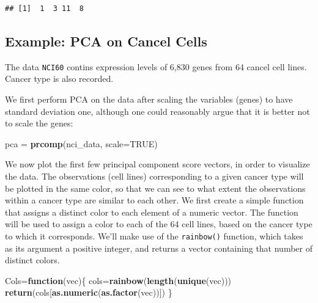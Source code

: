 \documentclass[openany]{book}
\newenvironment{Shaded}{\begin{snugshade}}{\end{snugshade}}
\newcommand{\ControlFlowTok}[1]{\textcolor[rgb]{0.13,0.29,0.53}{\textbf{#1}}}
\newcommand{\DataTypeTok}[1]{\textcolor[rgb]{0.13,0.29,0.53}{#1}}
\newcommand{\KeywordTok}[1]{\textcolor[rgb]{0.13,0.29,0.53}{\textbf{#1}}}
\newcommand{\NormalTok}[1]{#1}
\newcommand{\OperatorTok}[1]{\textcolor[rgb]{0.81,0.36,0.00}{\textbf{#1}}}
\newcommand{\OtherTok}[1]{\textcolor[rgb]{0.56,0.35,0.01}{#1}}
\newcommand{\StringTok}[1]{\textcolor[rgb]{0.31,0.60,0.02}{#1}}
\begin{document}
\begin{verbatim}
## [1]  1  3 11  8
\end{verbatim}

\hypertarget{example-pca-on-cancel-cells}{%
\subsection{Example: PCA on Cancel Cells}\label{example-pca-on-cancel-cells}}

The data \texttt{NCI60} contins expression levels of 6,830 genes from 64 cancel cell lines. Cancer type is also recorded.

\begin{Shaded}
\end{Shaded}

We first perform PCA on the data after scaling the variables (genes) to
have standard deviation one, although one could reasonably argue that it
is better not to scale the genes:

\begin{Shaded}
\begin{Highlighting}[]
\NormalTok{pca =}\StringTok{ }\KeywordTok{prcomp}\NormalTok{(nci_data, }\DataTypeTok{scale=}\OtherTok{TRUE}\NormalTok{)}
\end{Highlighting}
\end{Shaded}

We now plot the first few principal component score vectors, in order to
visualize the data. The observations (cell lines) corresponding to a given
cancer type will be plotted in the same color, so that we can see to what
extent the observations within a cancer type are similar to each other. We
first create a simple function that assigns a distinct color to each element
of a numeric vector. The function will be used to assign a color to each of
the 64 cell lines, based on the cancer type to which it corresponds.
We'll make use of the \texttt{rainbow()} function, which takes as its argument a positive integer,
and returns a vector containing that number of distinct colors.

\begin{Shaded}
\begin{Highlighting}[]
\NormalTok{Cols=}\ControlFlowTok{function}\NormalTok{(vec)\{}
\NormalTok{    cols=}\KeywordTok{rainbow}\NormalTok{(}\KeywordTok{length}\NormalTok{(}\KeywordTok{unique}\NormalTok{(vec)))}
    \KeywordTok{return}\NormalTok{(cols[}\KeywordTok{as.numeric}\NormalTok{(}\KeywordTok{as.factor}\NormalTok{(vec))])}
\NormalTok{  \}}
\end{Highlighting}
\end{Shaded}
\end{document}
